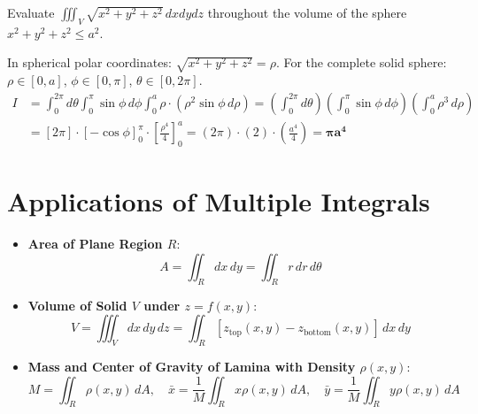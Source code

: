 \begin{example}
Evaluate $\iiint_V \sqrt{x^2+y^2+z^2}\,dx dy dz$ throughout the volume of the sphere $x^2+y^2+z^2 \le a^2$.
\end{example}

\begin{solutionbox}
In spherical polar coordinates: $\sqrt{x^2+y^2+z^2} = \rho$.
For the complete solid sphere: $\rho \in [0, a]$, $\phi \in [0, \pi]$, $\theta \in [0, 2\pi]$.
\begin{align*}
    I &= \int_0^{2\pi} d\theta \int_0^\pi \sin\phi\,d\phi \int_0^a \rho \cdot (\rho^2 \sin\phi\,d\rho) = \left(\int_0^{2\pi} d\theta\right) \left(\int_0^\pi \sin\phi\,d\phi\right) \left(\int_0^a \rho^3\,d\rho\right) \\
    &= [2\pi] \cdot [-\cos\phi]_0^\pi \cdot \left[ \frac{\rho^4}{4} \right]_0^a = (2\pi) \cdot (2) \cdot \left(\frac{a^4}{4}\right) = \mathbf{\pi a^4}
\end{align*}
\end{solutionbox}

\section{Applications of Multiple Integrals}

\begin{itemize}[leftmargin=1.5em]
    \item \textbf{Area of Plane Region $R$}:
    \begin{equation}
        A = \iint_R dx\,dy = \iint_R r\,dr\,d\theta
    \end{equation}
    \item \textbf{Volume of Solid $V$ under $z = f(x,y)$}:
    \begin{equation}
        V = \iiint_V dx\,dy\,dz = \iint_R [z_{\text{top}}(x,y) - z_{\text{bottom}}(x,y)]\,dx\,dy
    \end{equation}
    \item \textbf{Mass and Center of Gravity of Lamina with Density $\rho(x,y)$}:
    \begin{equation}
        M = \iint_R \rho(x,y)\,dA, \quad \bar{x} = \frac{1}{M}\iint_R x\rho(x,y)\,dA, \quad \bar{y} = \frac{1}{M}\iint_R y\rho(x,y)\,dA
    \end{equation}
\end{itemize}

